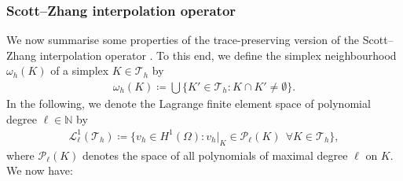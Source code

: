 \documentclass[reqno,a4paper]{amsart}
\def\tria{\mathcal{T}_h}
\begin{document}
\subsubsection{Scott--Zhang interpolation operator}
%
We now summarise some properties of the trace-preserving version of the Scott--Zhang interpolation operator \cite{SZ.1990}.
To this end, we define the simplex neighbourhood $\omega_h(K)$ of a simplex $K \in \tria$ by 
\begin{align}\label{def:ngbh}
	\omega_h(K) \coloneqq \bigcup \{K' \in \tria \colon K \cap K' \neq \emptyset \}. 
\end{align}
In the following, we denote the Lagrange finite element space of polynomial degree $\ell \in \mathbb{N}$ by 
\begin{align}\label{def:Lagrange}
	\mathcal{L}^1_{\ell}(\tria) \coloneqq \{v_h \in H^1(\Omega) \colon  v_h|_{K} \in \mathcal{P}_{\ell}(K) \;\,\forall K \in \tria\},
\end{align}
where $\mathcal{P}_{\ell}(K)$ denotes the space of all polynomials of maximal degree $\ell$ on $K$. We now have:
\end{document}
